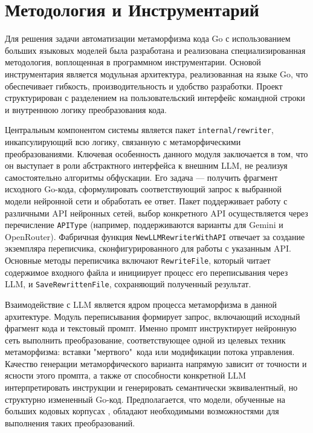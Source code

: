 \section{Методология и Инструментарий}

Для решения задачи автоматизации метаморфизма кода Go с использованием больших языковых моделей была разработана и реализована специализированная методология, воплощенная в программном инструментарии. Основой инструментария является модульная архитектура, реализованная на языке Go, что обеспечивает гибкость, производительность и удобство разработки. Проект структурирован с разделением на пользовательский интерфейс командной строки и внутреннюю логику преобразования кода.

Центральным компонентом системы является пакет \texttt{internal/rewriter}, инкапсулирующий всю логику, связанную с метаморфическими преобразованиями. Ключевая особенность данного модуля заключается в том, что он выступает в роли абстрактного интерфейса к внешним LLM, не реализуя самостоятельно алгоритмы обфускации. Его задача — получить фрагмент исходного Go-кода, сформулировать соответствующий запрос к выбранной модели нейронной сети и обработать ее ответ. Пакет поддерживает работу с различными API нейронных сетей, выбор конкретного API осуществляется через перечисление \texttt{APIType} (например, поддерживаются варианты для Gemini и OpenRouter). Фабричная функция \texttt{NewLLMRewriterWithAPI} отвечает за создание экземпляра переписчика, сконфигурированного для работы с указанным API. Основные методы переписчика включают \texttt{RewriteFile}, который читает содержимое входного файла и инициирует процесс его переписывания через LLM, и \texttt{SaveRewrittenFile}, сохраняющий полученный результат.

Взаимодействие с LLM является ядром процесса метаморфизма в данной архитектуре. Модуль переписывания формирует запрос, включающий исходный фрагмент кода и текстовый промпт. Именно промпт инструктирует нейронную сеть выполнить преобразование, соответствующее одной из целевых техник метаморфизма: вставки "мертвого"\, кода или модификации потока управления. Качество генерации метаморфического варианта напрямую зависит от точности и ясности этого промпта, а также от способности конкретной LLM интерпретировать инструкции и генерировать семантически эквивалентный, но структурно измененный Go-код. Предполагается, что модели, обученные на больших кодовых корпусах \cite{Chen21Evaluating}, обладают необходимыми возможностями для выполнения таких преобразований.

